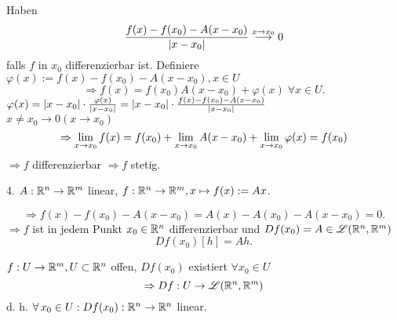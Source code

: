 \documentclass[../ana2.tex]{subfiles}
\begin{document}
Haben
\[ \frac{f(x) - f(x_0) - A(x-x_0)}{\left|x-x_0\right|} 
\overset{x \rightarrow x_0}{\longrightarrow} 0 \]
falls \( f \) in \(x_0\) differenzierbar ist.
Definiere \( \varphi(x) := f(x)-f(x_0)-A(x-x_0), x \in U \)
\[ \Rightarrow f(x) = f(x_0) A(x - x_0) + \varphi(x) 
\;\forall x \in U. \]
\( \varphi(x) = \left|x-x_0\right| \cdot 
\frac{\varphi(x)}{\left|x-x_0\right|}
= \left|x-x_0\right| \cdot \frac{f(x)-f(x_0)-A(x-x_0)}{\left|x-x_0\right|} \) \\
\( x \neq x_0 \rightarrow 0 (x \rightarrow x_0) \)
\[ \Rightarrow \lim\limits_{x\rightarrow{}x_0} f(x) = f(x_0) 
+ \lim\limits_{x\rightarrow{}x_0} A(x-x_0) 
+ \lim\limits_{x\rightarrow{}x_0} \varphi(x) = f(x_0) \]
\( \Rightarrow f \) differenzierbar \( \Rightarrow f \) stetig.

\begin{bsp}
    4. \( A:\mathbb{R}^n\rightarrow \mathbb{R}^m \) linear, 
    \( f:\mathbb{R}^n\rightarrow \mathbb{R}^m, x \mapsto f(x) := Ax \).

    \[ \Rightarrow f(x) - f(x_0) - A(x - x_0) 
    = A(x) - A(x_0) - A(x - x_0) = 0. \]
    \( \Rightarrow f \) ist in jedem Punkt \( x_0 \in \mathbb{R}^n \) 
    differenzierbar und \( Df(x_0) = A \in \mathscr{L}(\mathbb{R}^n, \mathbb{R}^m) \)
    \[ D f(x_0)[h] = Ah. \]

    \( f:U\rightarrow \mathbb{R}^m, U \subset \mathbb{R}^n \) offen,
    \( Df (x_0) \) existiert \( \forall x_0 \in U \)
    \[ \Rightarrow Df:U\rightarrow \mathscr{L}(\mathbb{R}^n, \mathbb{R}^m) \]
    d. h. \( \forall x_0 \in U: \abb{Df (x_0)}{\R^n}{\R^n} \) linear.

\end{bsp}
\end{document}

